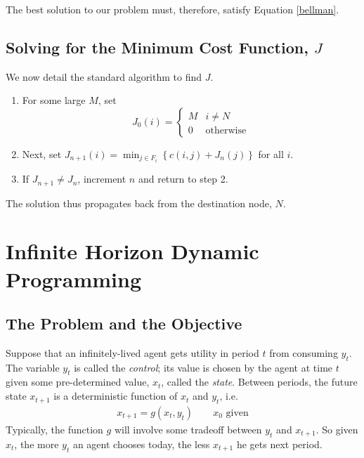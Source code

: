 \documentclass[a4paper,12pt]{scrartcl}
\begin{document}
The best solution to our problem must, therefore, satisfy Equation
\ref{bellman}.

\subsection{Solving for the Minimum Cost Function, $J$}

We now detail the standard algorithm to find $J$.
\begin{enumerate}
    \item For some large $M$, set
	\begin{equation}
	    J_0(i) = \begin{cases} M & i \neq N \\ 
				    0 & \text{otherwise}
		    \end{cases}
	\end{equation}

    \item Next, set 
	$J_{n+1}(i) = \min_{j \in F_i} \left\{ c(i,j) + J_n(j)\right\}$
	for all $i$.

    \item If $J_{n+1} \neq J_n$, increment $n$ and return to step 2.

\end{enumerate}
The solution thus propagates back from the destination node, $N$.



\clearpage
\section{Infinite Horizon Dynamic Programming}


\subsection{The Problem and the Objective}

Suppose that an infinitely-lived agent gets utility in period
$t$ from consuming $y_t$. The variable $y_t$ is called the
\emph{control}; its value is chosen by the agent at time $t$
given some pre-determined value, $x_t$, called the \emph{state}.
Between periods, the future state $x_{t+1}$ is a deterministic function of $x_t$ and
$y_t$, i.e.
\begin{align}
  \label{xevol}
  x_{t+1} = g(x_t, y_t)
  \qquad
  \text{$x_0$ given}
\end{align}
Typically, the function $g$ will
involve some tradeoff between $y_t$ and $x_{t+1}$. So given
$x_t$, the more $y_t$ an agent chooses today, the less $x_{t+1}$ he
gets next period. 
\end{document}
